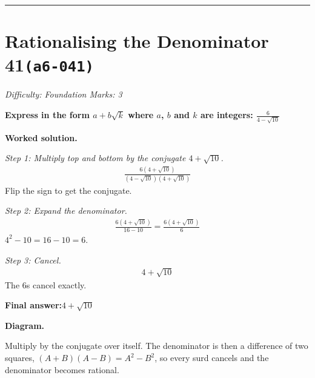 \documentclass[11pt]{article}
\newcommand{\question}[1]{\par\medskip\noindent\textbf{#1}\par}
\begin{document}
\medskip\hrule

\section*{Rationalising the Denominator 41\quad\small\texttt{(a6-041)}}
\textit{Difficulty: Foundation \quad\textbar\quad Marks: 3}

\question{Express in the form \( a + b\sqrt{k} \) where \( a \), \( b \) and \( k \) are integers: \( \frac{6}{4 - \sqrt{10}} \)}

\textbf{Worked solution.}

\textit{Step 1: Multiply top and bottom by the conjugate \( 4 + \sqrt{10} \).}
\[\begin{gathered}
\frac{6(4 + \sqrt{10})}{(4 - \sqrt{10})(4 + \sqrt{10})}
\end{gathered}\]
Flip the sign to get the conjugate.

\textit{Step 2: Expand the denominator.}
\[\begin{gathered}
\frac{6(4 + \sqrt{10})}{16 - 10} = \frac{6(4 + \sqrt{10})}{6}
\end{gathered}\]
\( 4^2 - 10 = 16 - 10 = 6 \).

\textit{Step 3: Cancel.}
\[\begin{gathered}
4 + \sqrt{10}
\end{gathered}\]
The 6s cancel exactly.

\begin{answerbox}
\textbf{Final answer:}\quad \(\displaystyle 4 + \sqrt{10}\)
\end{answerbox}
\textbf{Diagram.}

\begin{center}
\end{center}
\small Multiply by the conjugate over itself. The denominator is then a difference of two squares, $(A+B)(A-B)=A^{2}-B^{2}$, so every surd cancels and the denominator becomes rational.\normalsize
\end{document}
